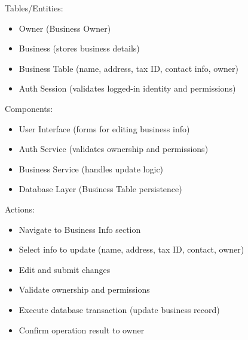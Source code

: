 \documentclass[]{VUMIFTemplateClass}
\begin{document}
Tables/Entities:
\begin{itemize}
    \setlength{\itemsep}{2pt}
    \setlength{\parskip}{0pt}
    \setlength{\parsep}{0pt}
    \item Owner (Business Owner)
    \item Business (stores business details)
    \item Business Table (name, address, tax ID, contact info, owner)
    \item Auth Session (validates logged-in identity and permissions)
\end{itemize}

Components:
\begin{itemize}
    \setlength{\itemsep}{2pt}
    \setlength{\parskip}{0pt}
    \setlength{\parsep}{0pt}
    \item User Interface (forms for editing business info)
    \item Auth Service (validates ownership and permissions)
    \item Business Service (handles update logic)
    \item Database Layer (Business Table persistence)
\end{itemize}

Actions:
\begin{itemize}
    \setlength{\itemsep}{2pt}
    \setlength{\parskip}{0pt}
    \setlength{\parsep}{0pt}
    \item Navigate to Business Info section
    \item Select info to update (name, address, tax ID, contact, owner)
    \item Edit and submit changes
    \item Validate ownership and permissions
    \item Execute database transaction (update business record)
    \item Confirm operation result to owner
\end{itemize}
\end{document}
